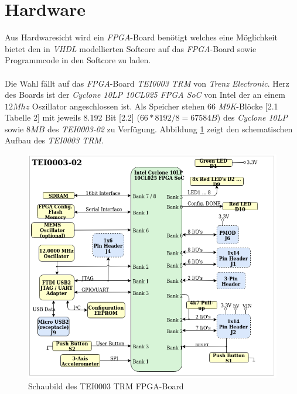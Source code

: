         \section{Hardware}\label{lab:hardware}
            Aus Hardwaresicht wird ein \textit{FPGA}-Board benötigt welches eine Möglichkeit bietet
            den in \textit{VHDL} modellierten Softcore auf das \textit{FPGA}-Board sowie Programmcode
            in den Softcore zu laden.
            \\\\
            Die Wahl fällt auf das \textit{FPGA}-Board \textit{TEI0003 TRM} von \textit{Trenz Electronic}.
            Herz des Boards ist der \textit{Cyclone 10LP 10CL025 FPGA SoC} von Intel der an einem $12 Mhz$
            Oszillator angeschlossen ist. 
            Als Speicher stehen 66 \textit{M9K}-Blöcke \cite{intel-cyc10lp-io-datasheet}[2.1 Tabelle 2] mit jeweils 8.192 Bit
            \cite{intel-cyc10lp-io-datasheet}[2.2] ($66*8192/8 = 67584B$) des \textit{Cyclone 10LP} sowie $8 MB$ des \textit{TEI0003-02} zu Verfügung.
            Abbildung \ref{fig:fpga_schematic} zeigt den schematischen Aufbau des \textit{TEI0003 TRM}.
            \begin{figure}[H]
                \centering
                \includegraphics[scale=0.5]{img/fpga_board_schematic.png}
                \caption[Schaubild des TEI0003 TRM FPGA-Board]{Schaubild des TEI0003 TRM FPGA-Board \cite{terz} }
                \label{fig:fpga_schematic}
            \end{figure}

